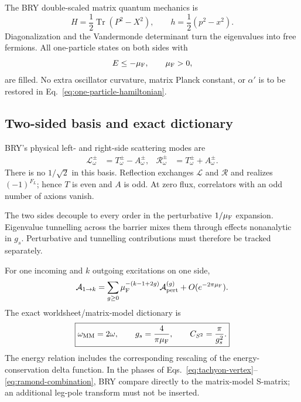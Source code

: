 \documentclass[11pt]{article}
\newcommand{\ap}{\alpha'}
\begin{document}
The BRY double-scaled matrix quantum mechanics is
\begin{equation}
 H=\frac12\operatorname{Tr}(P^2-X^2),
 \qquad
 h=\frac12(p^2-x^2).
 \label{eq:one-particle-hamiltonian}
\end{equation}
Diagonalization and the Vandermonde determinant turn the eigenvalues into
free fermions.  All one-particle states on both sides with
\begin{equation}
 E\le-\mu_{\rm F},\qquad \mu_{\rm F}>0,
 \label{eq:fermi-level}
\end{equation}
are filled.  No extra oscillator curvature, matrix Planck constant, or
$\ap$ is to be restored in Eq.~\eqref{eq:one-particle-hamiltonian}.

\subsection{Two-sided basis and exact dictionary}

BRY's physical left- and right-side scattering modes are
\begin{align}
 \mathcal L_\omega^\pm&=T_\omega^\pm-A_\omega^\pm,
 &
 \mathcal R_\omega^\pm&=T_\omega^\pm+A_\omega^\pm.
 \label{eq:lr-basis}
\end{align}
There is no $1/\sqrt2$ in this basis.  Reflection exchanges
$\mathcal L$ and $\mathcal R$ and realizes $(-1)^{F_L}$; hence $T$ is even
and $A$ is odd.  At zero flux, correlators with an odd number of axions
vanish.

The two sides decouple to every order in the perturbative
$1/\mu_{\rm F}$ expansion.
Eigenvalue tunnelling across the barrier mixes them through effects
nonanalytic in $g_s$.  Perturbative and tunnelling contributions must therefore
be tracked separately.

For one incoming and $k$ outgoing excitations on one side,
\begin{equation}
 \mathcal A_{1\to k}
 =\sum_{g\ge0}\mu_{\rm F}^{-(k-1+2g)}
 \mathcal A_{\rm pert}^{(g)}
 +O(e^{-2\pi\mu_{\rm F}}).
 \label{eq:mm-genus-expansion}
\end{equation}
The exact worldsheet/matrix-model dictionary is
\begin{equation}
 \boxed{
 \omega_{\rm MM}=2\omega,\qquad
 g_s=\frac4{\pi\mu_{\rm F}},\qquad
 C_{S^2}=\frac{\pi}{g_s^2}.}
 \label{eq:bry-dictionary}
\end{equation}
The energy relation includes the corresponding rescaling of the
energy-conservation delta function.  In the phases of
Eqs.~\eqref{eq:tachyon-vertex}--\eqref{eq:ramond-combination}, BRY compare
directly to the matrix-model S-matrix; an additional leg-pole transform
must not be inserted.
\end{document}
